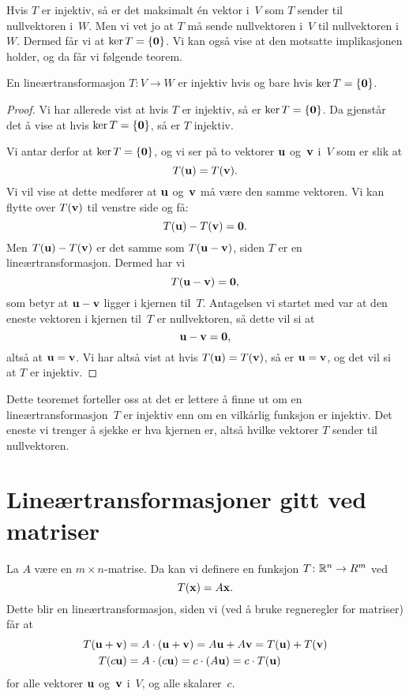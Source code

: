 Hvis $T$ er injektiv, så er det maksimalt én vektor i~$V$ som $T$
sender til nullvektoren i~$W$.  Men vi vet jo at $T$ må sende
nullvektoren i~$V$ til nullvektoren i~$W$.  Dermed får vi at
$\ker T = \{ \mathbf{0} \}$.  Vi kan også vise at den motsatte implikasjonen
holder, og da får vi følgende teorem.

\begin{thm}
En lineærtransformasjon $T \colon V \to W$ er injektiv hvis og bare
hvis $\ker T = \{ \mathbf{0} \}$.
\end{thm}
\begin{proof}
Vi har allerede vist at hvis $T$ er injektiv, så er
$\ker T = \{ \mathbf{0} \}$.  Da gjenstår det å vise at hvis
$\ker T = \{ \mathbf{0} \}$, så er $T$ injektiv.

Vi antar derfor at $\ker T = \{ \mathbf{0} \}$, og vi ser på to vektorer $\mathbf{u}$
og~$\mathbf{v}$ i~$V$ som er slik at
\[
T(\mathbf{u}) = T(\mathbf{v}).
\]
Vi vil vise at dette medfører at $\mathbf{u}$ og~$\mathbf{v}$ må være den samme
vektoren.  Vi kan flytte over $T(\mathbf{v})$ til venstre side og få:
\[
T(\mathbf{u}) - T(\mathbf{v}) = \mathbf{0}.
\]
Men $T(\mathbf{u}) - T(\mathbf{v})$ er det samme som $T(\mathbf{u}-\mathbf{v})$, siden $T$ er en
lineærtransformasjon.  Dermed har vi
\[
T(\mathbf{u} - \mathbf{v}) = \mathbf{0},
\]
som betyr at $\mathbf{u} - \mathbf{v}$ ligger i kjernen til~$T$.  Antagelsen vi
startet med var at den eneste vektoren i kjernen til~$T$ er
nullvektoren, så dette vil si at
\[
\mathbf{u} - \mathbf{v} = \mathbf{0},
\]
altså at $\mathbf{u} = \mathbf{v}$.  Vi har altså vist at hvis $T(\mathbf{u}) = T(\mathbf{v})$, så er
$\mathbf{u} = \mathbf{v}$, og det vil si at $T$ er injektiv.
\end{proof}

Dette teoremet forteller oss at det er lettere å finne ut om en
lineærtransformasjon~$T$ er injektiv enn om en vilkårlig funksjon er
injektiv.  Det eneste vi trenger å sjekke er hva kjernen er, altså
hvilke vektorer $T$ sender til nullvektoren.


\section*{Lineærtransformasjoner gitt ved matriser}

La $A$ være en $m \times n$-matrise.  Da kan vi definere en funksjon
$T \colon \mathbb{R}^n \to R^m$ ved
\[
T(\mathbf{x}) = A \mathbf{x}.
\]
Dette blir en lineærtransformasjon, siden vi (ved å bruke regneregler
for matriser) får at
\begin{align*}
T(\mathbf{u} + \mathbf{v}) &= A \cdot (\mathbf{u} + \mathbf{v}) = A\mathbf{u} + A\mathbf{v} = T(\mathbf{u}) + T(\mathbf{v}) \\
T(c\mathbf{u}) &= A \cdot (c\mathbf{u}) = c \cdot (A\mathbf{u}) = c \cdot T(\mathbf{u})
\end{align*}
for alle vektorer $\mathbf{u}$ og~$\mathbf{v}$ i~$V$, og alle skalarer~$c$.


